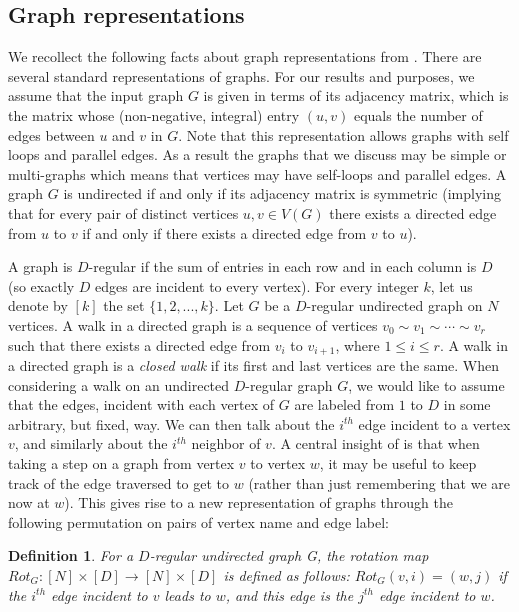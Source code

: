 \documentclass{article}
\newtheorem{definition}[theorem]{Definition}
\begin{document}
\subsection{Graph representations}
We recollect the following facts about graph representations from \cite{RVW2002, Rei2008}. There are several standard representations of graphs. For our results and purposes, we assume that the input graph $G$ is given in terms of its adjacency matrix, which is the matrix whose (non-negative, integral) entry $(u,v)$ equals the number of edges between $u$ and $v$ in $G$. Note that this representation allows graphs with self loops and parallel edges. As a result the graphs that we discuss may be simple or multi-graphs which means that vertices may have self-loops and parallel edges. A graph $G$ is undirected if and only if its adjacency matrix is symmetric (implying that for every pair of distinct vertices $u,v\in V(G)$ there exists a directed edge from $u$ to $v$ if and only if there exists a directed edge from $v$ to $u$).

A graph is $D$-regular if the sum of entries in each row and in each column is $D$ (so exactly $D$ edges are incident to every vertex). For every integer $k$, let us denote by $[k]$ the set $\{1, 2, . . . , k\}$. Let $G$ be a $D$-regular undirected graph on $N$ vertices. A walk in a directed graph is a sequence of vertices $v_0\sim v_1\sim \cdots\sim  v_r$ such that there exists a directed edge from $v_i$ to $v_{i+1}$, where $1\leq i\leq r$. A walk in a directed graph is a {\it closed walk} if its first and last vertices are the same. When considering a walk on an undirected $D$-regular graph $G$, we would like to assume that the edges, incident with each vertex of $G$ are labeled from $1$ to $D$ in some arbitrary, but fixed, way. We can then talk about the $i^{th}$ edge incident to a vertex $v$, and similarly about the $i^{th}$ neighbor of $v$. A central insight of \cite{RVW2002} is that when taking a step on a graph from vertex $v$ to vertex $w$, it may be useful to keep track of the edge traversed to get to $w$ (rather than just remembering that we are now at $w$). This gives rise to a new representation of graphs through the following permutation on pairs of vertex name and edge label:
\begin{definition}\label{rotationmap}{\rm \cite[Definition 2.1]{Rei2008}}
For a $D$-regular undirected graph G, the rotation map $Rot_G : [N] \times [D] \rightarrow [N] \times [D]$ is defined as follows: $Rot_G (v, i ) = (w, j )$ if the $i^{th}$ edge incident to $v$ leads to $w$, and this edge is the $j^{th}$ edge incident to $w$.
\end{definition}
\end{document}
